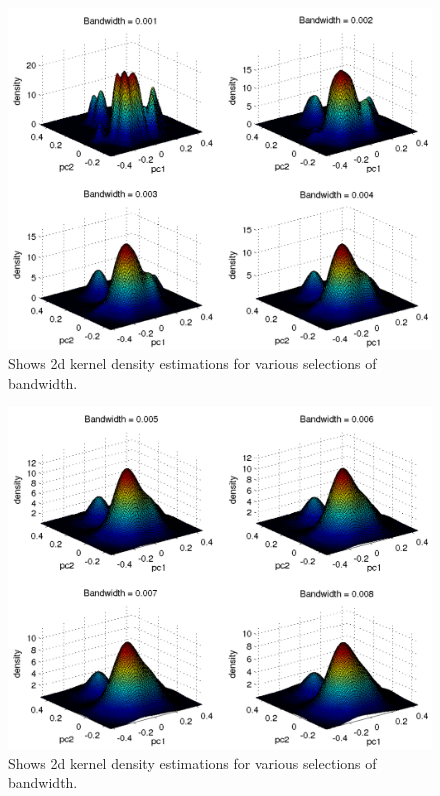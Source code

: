 \begin{figure}[!htbp]
  \centering
  \includegraphics[width=1.0\textwidth]{./images/q373dkde1}
  \caption{Shows 2d kernel density estimations for various selections
    of bandwidth.}
  \label{fig:q373dkde1}
\end{figure}

\begin{figure}[!htbp]
  \centering
  \includegraphics[width=1.0\textwidth]{./images/q373dkde2}
  \caption{Shows 2d kernel density estimations for various selections
    of bandwidth.}
  \label{fig:q373dkde2}
\end{figure}

